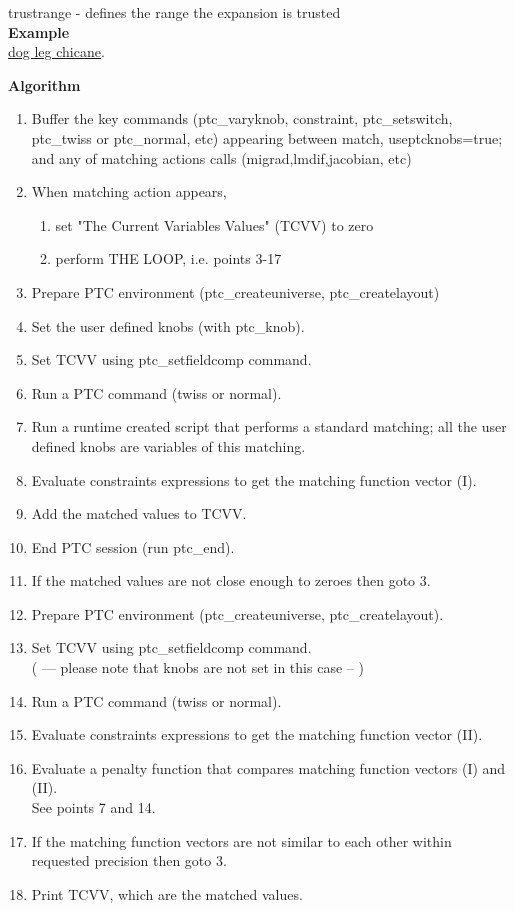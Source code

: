 trustrange - defines the range the expansion is trusted \\



{\bf Example}\\
\href{http://cern.ch/frs/mad-X_examples/ptc_madx_interface/matchknobs/.madx}{dog leg chicane}.


{\bf Algorithm}\\
\begin{enumerate}
   \item Buffer the key commands (ptc\_varyknob, constraint,
     ptc\_setswitch, ptc\_twiss or ptc\_normal, etc) appearing between 
     match, useptcknobs=true; and any of matching actions calls
     (migrad,lmdif,jacobian, etc) 
   \item  When matching action appears,  
     \begin{enumerate}
       \item set "The Current Variables Values" (TCVV) to zero      
       \item perform THE LOOP, i.e. points 3-17 
     \end{enumerate}
   \item Prepare PTC environment (ptc\_createuniverse,
     ptc\_createlayout)  
   \item Set the user defined knobs (with ptc\_knob).  
   \item Set TCVV using ptc\_setfieldcomp command.  
   \item Run a PTC command (twiss or normal).  
   \item Run a runtime created script that performs a standard matching;
     all the user defined knobs are variables of this matching.  
   \item Evaluate constraints expressions to get the matching function
     vector (I). 
   \item Add the matched values to TCVV. 
   \item End PTC session (run ptc\_end). 
   \item If the matched values are not close enough to zeroes then goto 3.
   \item Prepare PTC environment (ptc\_createuniverse,
     ptc\_createlayout). 
   \item Set TCVV using ptc\_setfieldcomp command.
     \\   ( --- please note that knobs are not set in this case  -- )  
   \item Run a PTC command (twiss or normal).
   \item Evaluate constraints expressions to get the matching function
     vector (II). 
   \item Evaluate a penalty function that compares matching function
     vectors (I) and (II).\\     See points 7 and 14.
   \item If the matching function vectors are not similar to each other
     within requested precision then goto 3. 
   \item Print TCVV, which are the matched values. 
\end{enumerate}


 
% 
% 
